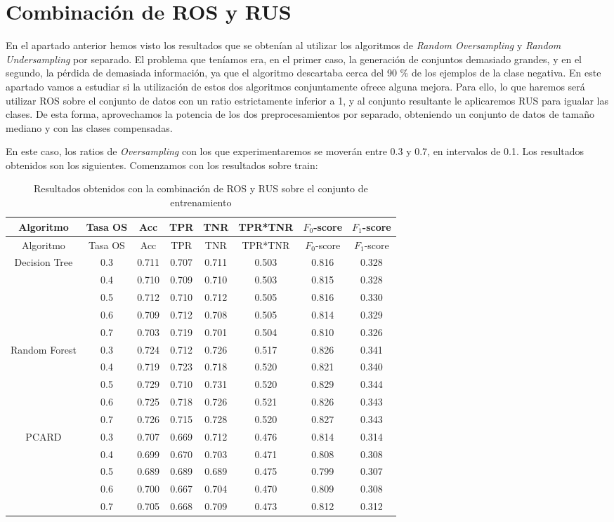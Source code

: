 \documentclass[
  a4paper,
,tablecaptionabove
]{scrartcl}
\begin{document}
\hypertarget{combinaciuxf3n-de-ros-y-rus}{%
\section{Combinación de ROS y RUS}\label{combinaciuxf3n-de-ros-y-rus}}

En el apartado anterior hemos visto los resultados que se obtenían al
utilizar los algoritmos de \emph{Random Oversampling} y \emph{Random
Undersampling} por separado. El problema que teníamos era, en el primer
caso, la generación de conjuntos demasiado grandes, y en el segundo, la
pérdida de demasiada información, ya que el algoritmo descartaba cerca
del 90 \% de los ejemplos de la clase negativa. En este apartado vamos a
estudiar si la utilización de estos dos algoritmos conjuntamente ofrece
alguna mejora. Para ello, lo que haremos será utilizar ROS sobre el
conjunto de datos con un ratio estrictamente inferior a 1, y al conjunto
resultante le aplicaremos RUS para igualar las clases. De esta forma,
aprovechamos la potencia de los dos preprocesamientos por separado,
obteniendo un conjunto de datos de tamaño mediano y con las clases
compensadas.

En este caso, los ratios de \emph{Oversampling} con los que
experimentaremos se moverán entre 0.3 y 0.7, en intervalos de 0.1. Los
resultados obtenidos son los siguientes. Comenzamos con los resultados
sobre train:

\begin{longtable}[]{@{}cccccccc@{}}
\caption{Resultados obtenidos con la combinación de ROS y RUS sobre el
conjunto de entrenamiento}\tabularnewline
\toprule
Algoritmo & Tasa OS & Acc & TPR & TNR & TPR*TNR & \(F_0\)-score &
\(F_1\)-score\tabularnewline
\midrule
\endfirsthead
\toprule
Algoritmo & Tasa OS & Acc & TPR & TNR & TPR*TNR & \(F_0\)-score &
\(F_1\)-score\tabularnewline
\midrule
\endhead
Decision Tree & 0.3 & 0.711 & 0.707 & 0.711 & 0.503 & 0.816 &
0.328\tabularnewline
& 0.4 & 0.710 & 0.709 & 0.710 & 0.503 & 0.815 & 0.328\tabularnewline
& 0.5 & 0.712 & 0.710 & 0.712 & 0.505 & 0.816 & 0.330\tabularnewline
& 0.6 & 0.709 & 0.712 & 0.708 & 0.505 & 0.814 & 0.329\tabularnewline
& 0.7 & 0.703 & 0.719 & 0.701 & 0.504 & 0.810 & 0.326\tabularnewline
\midrule
Random Forest & 0.3 & 0.724 & 0.712 & 0.726 & 0.517 & 0.826 &
0.341\tabularnewline
& 0.4 & 0.719 & 0.723 & 0.718 & 0.520 & 0.821 & 0.340\tabularnewline
& 0.5 & 0.729 & 0.710 & 0.731 & 0.520 & 0.829 & 0.344\tabularnewline
& 0.6 & 0.725 & 0.718 & 0.726 & 0.521 & 0.826 & 0.343\tabularnewline
& 0.7 & 0.726 & 0.715 & 0.728 & 0.520 & 0.827 & 0.343\tabularnewline
\midrule
PCARD & 0.3 & 0.707 & 0.669 & 0.712 & 0.476 & 0.814 &
0.314\tabularnewline
& 0.4 & 0.699 & 0.670 & 0.703 & 0.471 & 0.808 & 0.308\tabularnewline
& 0.5 & 0.689 & 0.689 & 0.689 & 0.475 & 0.799 & 0.307\tabularnewline
& 0.6 & 0.700 & 0.667 & 0.704 & 0.470 & 0.809 & 0.308\tabularnewline
& 0.7 & 0.705 & 0.668 & 0.709 & 0.473 & 0.812 & 0.312\tabularnewline
\bottomrule
\end{longtable}
\end{document}
